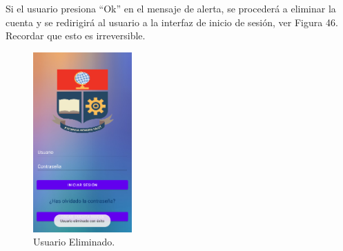 \documentclass[a4paper,10pt, oneside, titlepage]{article}
\begin{document}
	Si el usuario presiona ``Ok'' en el mensaje de alerta, se procederá a eliminar la cuenta y se redirigirá al usuario a la interfaz de inicio de sesión, ver Figura 46. Recordar que esto es irreversible.
	\begin{figure}[!ht]
		\centering
		\includegraphics[width = 0.4\linewidth, height = 6.9cm]{46.png}
		\caption{Usuario Eliminado.}
	\end{figure}
	
\end{document}
